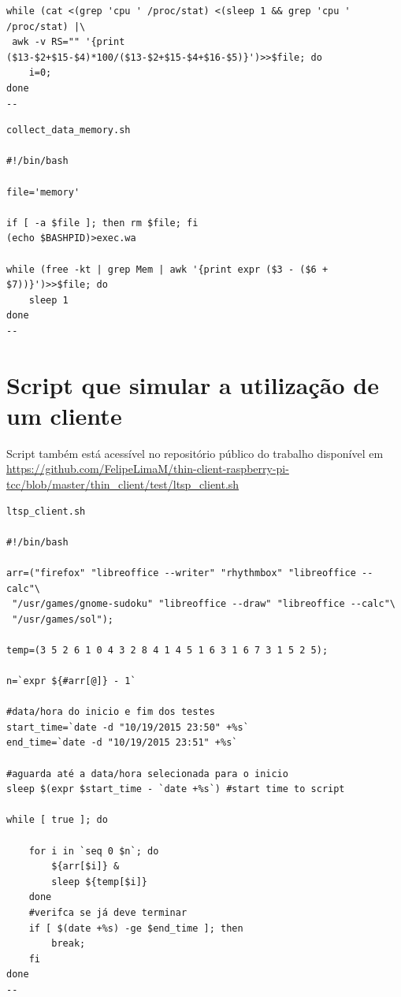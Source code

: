 \documentclass[
	12pt,				%
	openright,			%
	twoside,			%
	a4paper,			%
	chapter=TITLE,		%
	english,			%
	brazil				%
	]{abntex2}
\begin{document}
\begin{apendicesenv}
\begin{verbatim}
while (cat <(grep 'cpu ' /proc/stat) <(sleep 1 && grep 'cpu ' /proc/stat) |\
 awk -v RS="" '{print ($13-$2+$15-$4)*100/($13-$2+$15-$4+$16-$5)}')>>$file; do 
    i=0; 
done
--
\end{verbatim}


\begin{verbatim}
collect_data_memory.sh

#!/bin/bash

file='memory'

if [ -a $file ]; then rm $file; fi 
(echo $BASHPID)>exec.wa

while (free -kt | grep Mem | awk '{print expr ($3 - ($6 + $7))}')>>$file; do 
    sleep 1
done
--
\end{verbatim}


\chapter{Script que simular a utilização de um cliente}
\label{script:ExecClient}
Script também está acessível no repositório público do trabalho disponível em	 \url{https://github.com/FelipeLimaM/thin-client-raspberry-pi-tcc/blob/master/thin_client/test/ltsp_client.sh}

\begin{verbatim}
ltsp_client.sh

#!/bin/bash

arr=("firefox" "libreoffice --writer" "rhythmbox" "libreoffice --calc"\
 "/usr/games/gnome-sudoku" "libreoffice --draw" "libreoffice --calc"\
 "/usr/games/sol"); 

temp=(3 5 2 6 1 0 4 3 2 8 4 1 4 5 1 6 3 1 6 7 3 1 5 2 5);

n=`expr ${#arr[@]} - 1`

#data/hora do inicio e fim dos testes
start_time=`date -d "10/19/2015 23:50" +%s`
end_time=`date -d "10/19/2015 23:51" +%s`

#aguarda até a data/hora selecionada para o inicio
sleep $(expr $start_time - `date +%s`) #start time to script

while [ true ]; do
	
	for i in `seq 0 $n`; do
		${arr[$i]} &
		sleep ${temp[$i]}
	done
	#verifca se já deve terminar
	if [ $(date +%s) -ge $end_time ]; then
		break;
	fi
done
--
\end{verbatim}




\end{apendicesenv}


\end{document}
